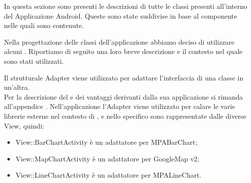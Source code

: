         In questa sezione sono presenti le descrizioni di tutte le classi presenti all'interno del  Applicazione Android. Queste sono state suddivise in base al componente nelle quali sono contenute.
        
        
    

        Nella progettazione delle classi dell'applicazione abbiamo deciso di utilizzare alcuni . Riportiamo di seguito una loro breve descrizione e il contesto nel quale sono stati utilizzati.
        
            Il  strutturale Adapter viene utilizzato per adattare l'interfaccia di una classe in un'altra.\\
            Per la descrizione del  e dei vantaggi derivanti dalla sua applicazione si rimanda all'appendice .
                Nell'applicazione  l'Adapter viene utilizzato per calare le varie librerie esterne nel contesto di \projectname{}, e nello specifico sono rappresentate dalle diverse View, quindi:
                \begin{itemize}
                    \item View::BarChartActivity è un adattatore per MPABarChart;
                    \item View::MapChartActivity è un adattatore per GoogleMap   v2;
                    \item View::LineChartActivity è un adattatore per MPALineChart.
                \end{itemize}
                
